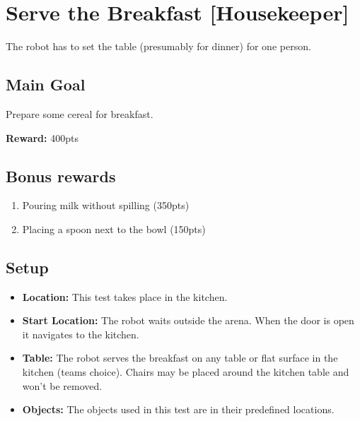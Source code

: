 \section{Serve the Breakfast [Housekeeper]}
\label{test:serve-the-breakfast}
The robot has to set the table (presumably for dinner) for one person.


\subsection*{Main Goal}
Prepare some cereal for breakfast.

\noindent\textbf{Reward:} 400pts

\subsection*{Bonus rewards}
\begin{enumerate}[nosep]
	\item Pouring milk without spilling (350pts)
	\item Placing a spoon next to the bowl (150pts)
\end{enumerate}

\subsection*{Setup}
\begin{itemize}[nosep]
	\item \textbf{Location:} This test takes place in the kitchen.
	\item \textbf{Start Location:} The robot waits outside the arena. When the door is open it navigates to the kitchen.
	\item \textbf{Table:} The robot serves the breakfast on any table or flat surface in the kitchen (teams choice). Chairs may be placed around the kitchen table and won't be removed.
	\item \textbf{Objects:} The objects used in this test are in their predefined locations.
\end{itemize}


